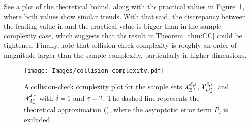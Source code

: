 See a plot of the theoretical bound, along with the practical values in Figure~\ref{fig:limit_graph_upper}, where both values show similar trends. With that said, the discrepancy between the leading value in  and the practical value is bigger than in the sample-complexity case, which suggests that the result in Theorem~\ref{thm:CC} could be tightened. Finally, note that collision-check complexity is roughly an order of magnitude larger than the sample complexity, particularly in higher dimensions. 
 
\begin{figure}[thb]
\texttt{[image: Images/collision\_complexity.pdf]}
\caption{A collision-check complexity  plot for the sample sets $\mathcal{X}_{\mathbb{Z}^d}^{\delta,\varepsilon},\mathcal{X}_{D_d^*}^{\delta,\varepsilon}$, and $\mathcal{X}_{A_d^*}^{\delta,\varepsilon}$ with $\delta=1$ and $\varepsilon=2$. The dashed line represents the theoretical approximation (), where the asymptotic error term $P_d$ is excluded. } 
\label{fig:limit_graph_upper}
\end{figure}



